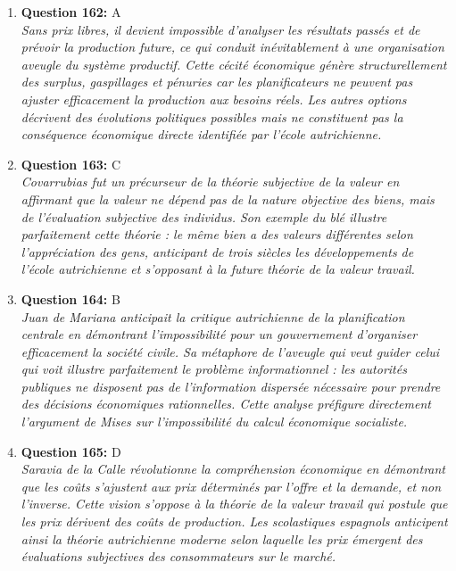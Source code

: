 \documentclass[12pt,a4paper]{article}
\begin{document}
\begin{enumerate}
\item \textbf{Question 162:} A
\\ \textit{Sans prix libres, il devient impossible d'analyser les résultats passés et de prévoir la production future, ce qui conduit inévitablement à une organisation aveugle du système productif. Cette cécité économique génère structurellement des surplus, gaspillages et pénuries car les planificateurs ne peuvent pas ajuster efficacement la production aux besoins réels. Les autres options décrivent des évolutions politiques possibles mais ne constituent pas la conséquence économique directe identifiée par l'école autrichienne.}

\item \textbf{Question 163:} C
\\ \textit{Covarrubias fut un précurseur de la théorie subjective de la valeur en affirmant que la valeur ne dépend pas de la nature objective des biens, mais de l'évaluation subjective des individus. Son exemple du blé illustre parfaitement cette théorie : le même bien a des valeurs différentes selon l'appréciation des gens, anticipant de trois siècles les développements de l'école autrichienne et s'opposant à la future théorie de la valeur travail.}

\item \textbf{Question 164:} B
\\ \textit{Juan de Mariana anticipait la critique autrichienne de la planification centrale en démontrant l'impossibilité pour un gouvernement d'organiser efficacement la société civile. Sa métaphore de l'aveugle qui veut guider celui qui voit illustre parfaitement le problème informationnel : les autorités publiques ne disposent pas de l'information dispersée nécessaire pour prendre des décisions économiques rationnelles. Cette analyse préfigure directement l'argument de Mises sur l'impossibilité du calcul économique socialiste.}

\item \textbf{Question 165:} D
\\ \textit{Saravia de la Calle révolutionne la compréhension économique en démontrant que les coûts s'ajustent aux prix déterminés par l'offre et la demande, et non l'inverse. Cette vision s'oppose à la théorie de la valeur travail qui postule que les prix dérivent des coûts de production. Les scolastiques espagnols anticipent ainsi la théorie autrichienne moderne selon laquelle les prix émergent des évaluations subjectives des consommateurs sur le marché.}


\end{enumerate}
\end{document}
